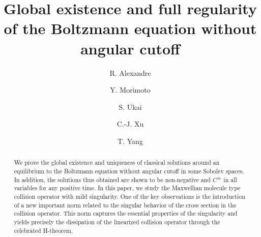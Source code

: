\documentclass{amsart}[12pt, article]
\begin{document}
\title[The Boltzmann equation without angular cutoff]
{Global existence and full regularity\\
of the Boltzmann equation without angular cutoff}
\author{R. Alexandre}
\address{R. Alexandre,
IRENAV Research Institute, French Naval Academy
Brest-Lanv\'eoc 29290, France}
\author{Y. Morimoto }
\address{Y. Morimoto, Graduate School of Human and Environmental Studies,
Kyoto University
\newline\indent
Kyoto, 606-8501, Japan} 
\author{S. Ukai}
\address{S. Ukai, 17-26 Iwasaki-cho, Hodogaya-ku, Yokohama 240-0015, Japan}
\author{C.-J. Xu}
\address{C.-J. Xu, School of Mathematics, Wuhan University 430072,
Wuhan, P. R. China
\newline\indent
and \newline\indent
Universit\'e de Rouen, UMR 6085-CNRS,
Math\'ematiques
\newline\indent
Avenue de l'Universit\'e,\,\, BP.12, 76801 Saint
Etienne du Rouvray, France } 
\author{T. Yang}
\address{T. Yang, Department of mathematics, City University of Hong Kong,
Hong Kong, P. R. China} 



\begin{abstract}

We prove the global existence and uniqueness of classical solutions around an equilibrium to the Boltzmann
equation without angular cutoff in some Sobolev spaces. In addition, the solutions thus
obtained are shown to be non-negative and $C^\infty$ in all variables for any positive time. In this paper, we study  the Maxwellian molecule type collision operator with
mild singularity. One of the
key observations is the introduction of a new important norm related to
the singular behavior of the cross section in the collision operator. This norm captures the essential properties of the singularity and
yields precisely the dissipation 
of the linearized collision operator
through the celebrated H-theorem.
\end{abstract}

\maketitle
\end{document}
